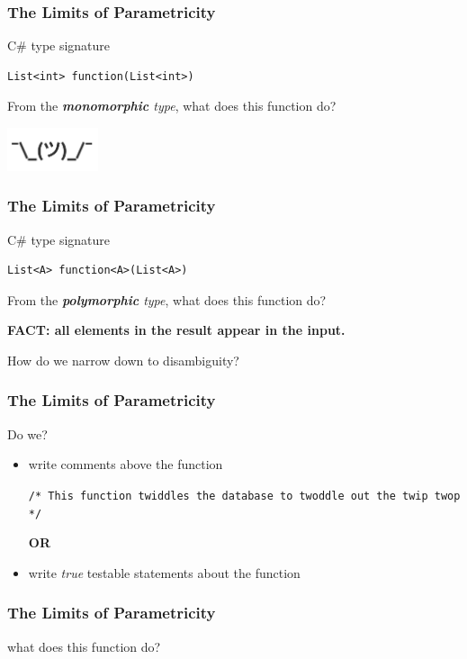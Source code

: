 \begin{frame}[fragile]
\frametitle{The Limits of Parametricity}
\begin{block}{C\# type signature}
\begin{lstlisting}[style=csharp]
List<int> function(List<int>)
\end{lstlisting}
From the \emph{\textbf{monomorphic} type}, what does this function do?
\end{block}
\includegraphics[width=0.2\textwidth]{image/shrug.png}
\end{frame}

\begin{frame}[fragile]
\frametitle{The Limits of Parametricity}
\begin{block}{C\# type signature}
\begin{lstlisting}[style=csharp]
List<A> function<A>(List<A>)
\end{lstlisting}
From the \emph{\textbf{polymorphic} type}, what does this function do?
\end{block}
\large{\textbf{FACT: all elements in the result appear in the input.}}

\tiny{How do we narrow down to disambiguity?}
\end{frame}

\begin{frame}[fragile]
\frametitle{The Limits of Parametricity}
\begin{block}{Do we?}
\begin{itemize}
  \item<1-> write comments above the function

            \lstinline[style=csharp]{/* This function twiddles the database to twoddle out the twip twop */}

            \textbf{OR}
  \item<2-> write \emph{true} testable statements about the function
\end{itemize}
\end{block}
\end{frame}

\begin{frame}[fragile]
\frametitle{The Limits of Parametricity}
\begin{block}{what does this function do?}

\end{block}
\end{frame}

